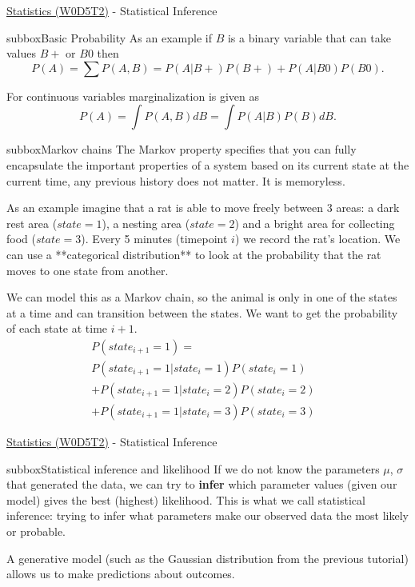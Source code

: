 \begin{multicols}{3}
\begin{textbox}{\href{https://compneuro.neuromatch.io/tutorials/W0D5_Statistics/student/W0D5_Tutorial2.html}{Statistics (W0D5T2)} - Statistical Inference}
\begin{subbox}{subbox}{Basic Probability}
As an example if $B$ is a binary variable that can take values $B+$ or $B0$ then 
$$P(A)=\sum P(A,B)=P(A|B+)P(B+)+ P(A|B0)P(B0). $$

For continuous variables marginalization is given as 
$$P(A)=\int P(A,B) dB=\int P(A|B)P(B) dB.$$ 
\end{subbox}
\begin{subbox}{subbox}{Markov chains}
\scriptsize
The Markov property specifies that you can fully encapsulate the important properties of a system based on its current state at the current time, any previous history does not matter. It is memoryless.

As an example imagine that a rat is able to move freely between 3 areas: a dark rest area
($state=1$), a nesting area ($state=2$) and a bright area for collecting food ($state=3$). Every 5 minutes (timepoint $i$) we record the rat's location. We can use a **categorical distribution** to look at the probability that the rat moves to one state from another.

We can model this as a Markov chain, so the animal is only in one of the states at a time and can transition between the states.
We want to get the probability of each state at time $i+1$.
\begin{align*}
P(state_{i+1} = 1)=&\\ P(state_{i+1}=1|state_i=1)P(state_i = 1)  \\ +P(state_{i+1}=1|state_i=2)P(state_i = 2)  \\ +P(state_{i+1}=1|state_i=3)P(state_i = 3)
\end{align*}

\end{subbox}
\end{textbox}
\begin{textbox}{\href{https://compneuro.neuromatch.io/tutorials/W0D5_Statistics/student/W0D5_Tutorial2.html}{Statistics (W0D5T2)} - Statistical Inference}
\begin{subbox}{subbox}{Statistical inference and likelihood}
\scriptsize
If we do not know the parameters $\mu$, $\sigma$ that generated the data, we can try to \textbf{infer} which parameter values (given our model) gives the best (highest) likelihood. This is what we call statistical inference: trying to infer what parameters make our observed data the most likely or probable.

A generative model (such as the Gaussian distribution from the previous tutorial) allows us to make predictions about outcomes. 


\end{subbox}
\end{textbox}
\end{multicols}

